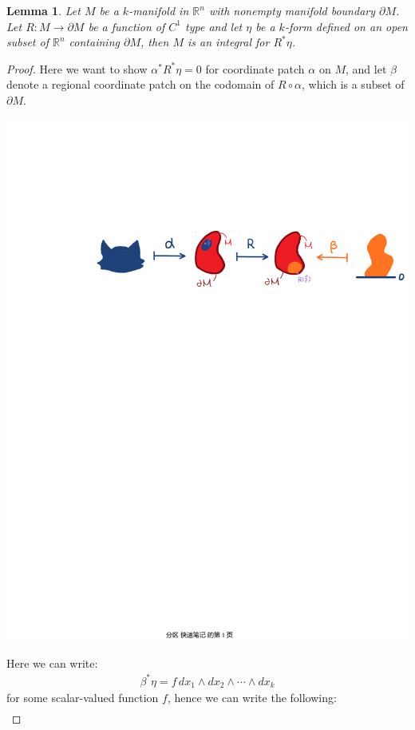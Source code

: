 \documentclass[15pt]{book}
\theoremstyle{break}
\theoremstyle{break}
\newtheorem{lem}{Lemma}[thm]
\newcommand{\R}{\mathbb{R}}
\begin{document}
\begin{lem}
Let $M$ be a $k$-manifold in $\R^n$ with nonempty manifold boundary $\partial M$. Let $R:M \to \partial M$ be a function of $C^1$ type and let $\eta$ be a $k$-form defined on an open subset of $\R^n$ containing $\partial M$, then $M$ is an integral for $R^*\eta$. 
\end{lem}
\begin{proof}
Here we want to show $\alpha^*R^*\eta = 0$ for coordinate patch $\alpha$ on $M$, and let $\beta$ denote a regional coordinate patch on the codomain of $R\circ \alpha$, which is a subset of $\partial M$. 
\begin{center}
\includegraphics[scale=0.8]{retraction.pdf}
\end{center}
Here we can write:
\begin{align*}
\beta^*\eta = f\, dx_1 \wedge dx_2 \wedge \cdots \wedge dx_k
\end{align*}
for some scalar-valued function $f$, hence we can write the following:
\begin{align*}

\end{align*}
\end{proof}
\end{document}
